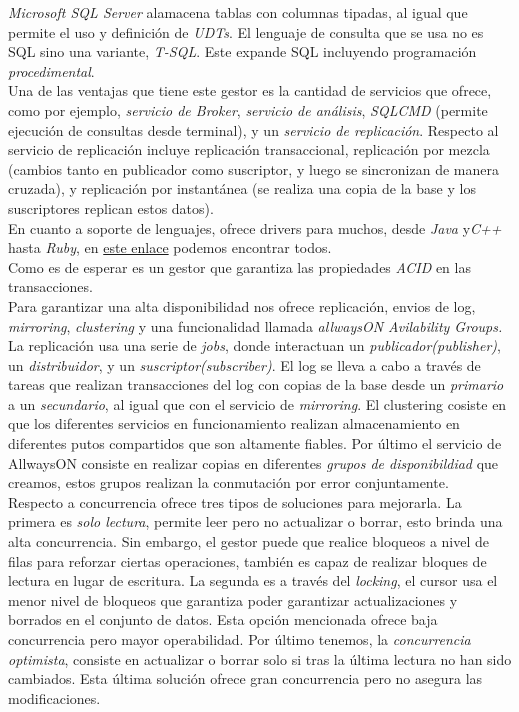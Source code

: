 \documentclass[3pt]{article}
\begin{document}
\emph{Microsoft SQL Server} alamacena tablas con columnas tipadas, al igual que permite el uso y definición de \emph{UDTs}. El lenguaje de consulta que se usa no es SQL sino una variante, \emph{T-SQL}. Este expande SQL incluyendo programación \emph{procedimental}.\\

Una de las ventajas que tiene este gestor es la cantidad de servicios que ofrece, como por ejemplo, \emph{servicio de Broker}, \emph{servicio de análisis}, \emph{SQLCMD }(permite ejecución de consultas desde terminal), y un \emph{servicio de replicación}. Respecto al servicio de replicación incluye replicación transaccional, replicación por mezcla (cambios tanto en publicador como suscriptor, y luego se sincronizan de manera cruzada), y replicación por instantánea (se realiza una copia de la base y los suscriptores replican estos datos). \\

En cuanto a soporte de lenguajes, ofrece drivers para muchos, desde \emph{Java} y\emph{C++} hasta \emph{Ruby}, en \href{https://docs.microsoft.com/en-us/sql/connect/homepage-sql-connection-programming?view=sql-server-ver15}{este enlace} podemos encontrar todos. \cite{MSSQL:1} \\

Como es de esperar es un gestor que garantiza las propiedades \emph{ACID} en las transacciones.\\
Para garantizar una alta disponibilidad nos ofrece replicación, envios de log, \emph{mirroring}, \emph{clustering} y una funcionalidad llamada \emph{allwaysON Avilability Groups.} La replicación usa una serie de \emph{jobs}, donde interactuan un \emph{publicador(publisher)}, un \emph{distribuidor}, y un \emph{suscriptor(subscriber)}. El log se lleva a cabo a través de tareas que realizan transacciones del log con copias de la base desde un \emph{primario} a un \emph{secundario}, al igual que con el servicio de \emph{mirroring}. El clustering cosiste en que los diferentes servicios en funcionamiento realizan almacenamiento en diferentes putos compartidos que son altamente fiables. Por último el servicio de AllwaysON consiste en realizar copias en diferentes \emph{grupos de disponibildiad} que creamos, estos grupos realizan la conmutación por error conjuntamente.\\

Respecto a concurrencia ofrece tres tipos de soluciones para mejorarla. La primera es \emph{solo lectura}, permite leer pero no actualizar o borrar, esto brinda una alta concurrencia. Sin embargo, el gestor puede que realice bloqueos a nivel de filas para reforzar ciertas operaciones, también es capaz de realizar bloques de lectura en lugar de escritura. La segunda es a través del \emph{locking}, el cursor usa el menor nivel de bloqueos que garantiza poder garantizar actualizaciones y borrados en el conjunto de datos. Esta opción mencionada ofrece baja concurrencia pero mayor operabilidad. Por último tenemos, la \emph{concurrencia optimista}, consiste en actualizar o borrar solo si tras la última lectura no han sido cambiados. Esta última solución ofrece gran concurrencia pero no asegura las modificaciones. \cite{MSSQL:2} \\
\end{document}
